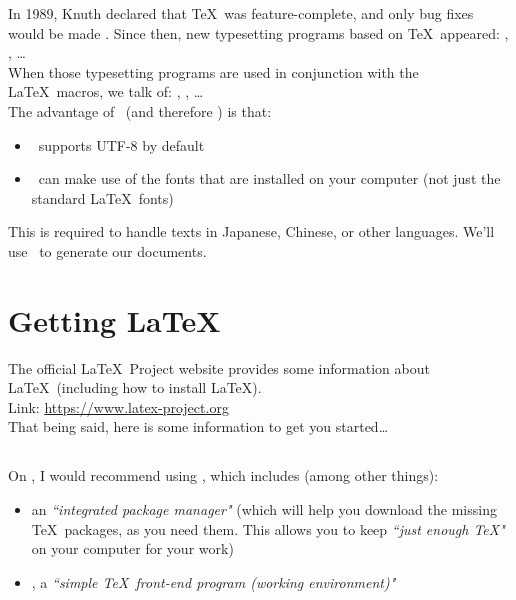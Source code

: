 

In 1989, Knuth declared that \TeX\ was feature-complete, and only bug fixes would be made \citep{tex-vs-latex}. Since then, new typesetting programs based on \TeX\ appeared: \pdfTeX, \XeTeX, \LuaTeX\dots\\

When those typesetting programs are used in conjunction with the \LaTeX\ macros, we talk of:  \pdfLaTeX, \XeLaTeX, \LuaLaTeX\dots \\

The advantage of \XeTeX\ (and therefore \XeLaTeX) is that:
\begin{itemize}
	\item \XeTeX\ supports UTF-8 by default
	\item \XeTeX\ can make use of the fonts that are installed on your computer (not just the standard \LaTeX\ fonts)
\end{itemize}

This is required to handle texts in Japanese, Chinese, or other languages. We'll use \XeLaTeX\ to generate our documents. \\



\section*{Getting \LaTeX}

The official \LaTeX\ Project website \citep{latex-project} provides some information about \LaTeX\ (including how to install \LaTeX). \\

Link: \url{https://www.latex-project.org} \\

That being said, here is some information to get you started\dots


\subsection*{\Windows}

On \Windows, I would recommend using \MiKTeX, which includes (among other things):

\begin{itemize}
	\item an \emph{``integrated package manager"} \citep{miktex-project} (which will help you download the missing \TeX\ packages, as you need them. This allows you to keep \emph{``just enough \TeX"} on your computer for your work)
	\item \TeXworks, a \emph{``simple \TeX\ front-end program (working environment)"} \citep{texworks}
\end{itemize}

